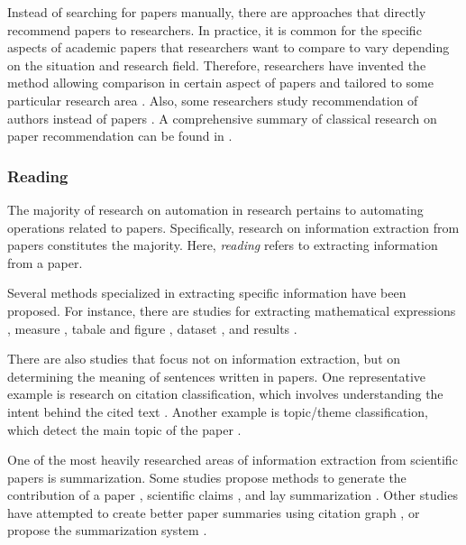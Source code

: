 \documentclass{article}
\begin{document}
Instead of searching for papers manually, there are approaches that directly recommend papers to researchers. In practice, it is common for the specific aspects of academic papers that researchers want to compare to vary depending on the situation and research field. Therefore, researchers have invented the method allowing comparison in certain aspect of papers \cite{ostendorff2020aspect} and tailored to some particular research area \cite{breitinger2022recommending}. Also, some researchers study recommendation of authors instead of papers \cite{portenoy2022bursting}. A comprehensive summary of classical research on paper recommendation can be found in \cite{bai2019scientific}.

\subsubsection{Reading}
The majority of research on automation in research pertains to automating operations related to papers. Specifically, research on information extraction from papers constitutes the majority. Here, \textit{reading} refers to extracting information from a paper.

Several methods specialized in extracting specific information have been proposed. For instance, there are studies for extracting mathematical expressions \cite{greiner2020math,madisetty2021neural}, measure \cite{harper2021semeval,kohler2021s}, tabale and figure \cite{shen2022vila,hashmi2021current,zhuang2022resel,yamamoto2021visual}, dataset \cite{hou2019identification,kumar2021dataquest,prasad2019dataset}, and results \cite{kardas2020axcell}.

There are also studies that focus not on information extraction, but on determining the meaning of sentences written in papers. One representative example is research on citation classification, which involves understanding the intent behind the cited text \cite{pride2019act,kunnath2021meta,kunnath2022dynamic,kunnath2022act2,lauscher2021multicite}. Another example is topic/theme classification, which detect the main topic of the paper \cite{sadat2022hierarchical,mendoza2022benchmark,salatino2022cso}.

One of the most heavily researched areas of information extraction from scientific papers is summarization. Some studies propose methods to generate the contribution of a paper \cite{hayashi2020s}, scientific claims \cite{wright2022generating}, and lay summarization \cite{goldsack2022making}. Other studies have attempted to create better paper summaries using citation graph \cite{chen2022scientific,an2021enhancing}, or propose the summarization system \cite{erera2019summarization}.
\end{document}
